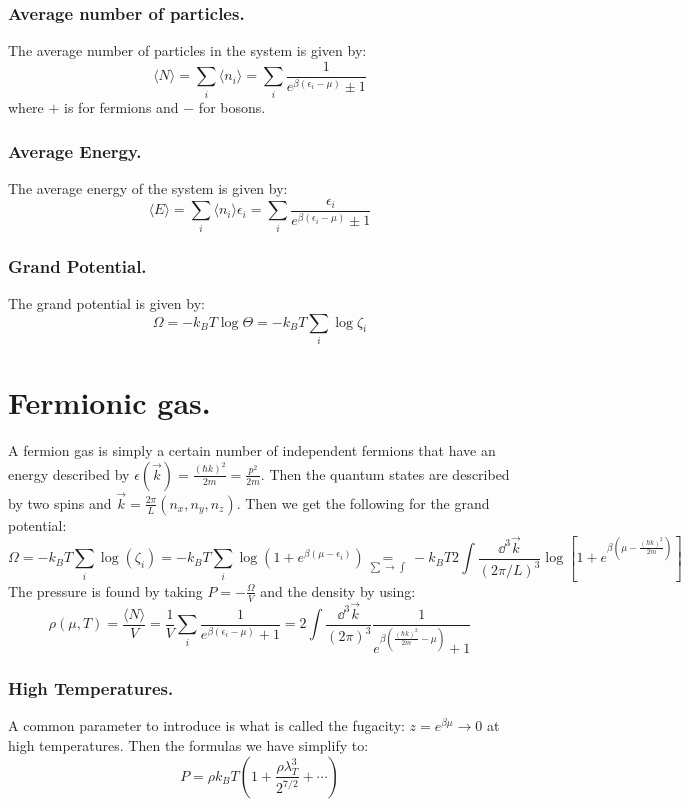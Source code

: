 \documentclass[10pt,a4paper]{book}
\begin{document}
\subsubsection{Average number of particles.}
The average number of particles in the system is given by:
\[
\langle N \rangle = \sum_i \langle n_i \rangle = \sum_i \frac{1}{e^{\beta(\epsilon_i - \mu)} \pm 1}
\]
where $+$ is for fermions and $-$ for bosons.
\subsubsection{Average Energy.}
The average energy of the system is given by:
\[
\langle E \rangle = \sum_i \langle n_i \rangle \epsilon_i = \sum_i \frac{\epsilon_i}{e^{\beta(\epsilon_i - \mu)} \pm 1}
\]

\subsubsection{Grand Potential.}
The grand potential is given by:
\[
\Omega = - k_B T \log \Theta = -k_B T \sum_i \log \zeta_i
\]

\section{Fermionic gas.}
A fermion gas is simply a certain number of independent fermions that have an energy described by $\epsilon(\vec{k}) = \frac{(\hbar k)^2}{2m} = \frac{p^2}{2m}$. Then the quantum states are described by two spins and $\vec{k} = \frac{2\pi}{L}(n_x, n_y, n_z)$. Then we get the following for the grand potential:
\[
\Omega = -k_BT\sum_i\log(\zeta_i)=-k_BT\sum_i\log(1+e^{\beta(\mu-\epsilon_i)})\underset{\sum\to\int}{=} -k_B T 2 \int \frac{\dd^3 \vec{k}}{(2 \pi/L)^3} \log[1 + e^{\beta(\mu - \frac{(\hbar k)^2}{2m})}]
\]
The pressure is found by taking $P = -\frac{\Omega}{V}$ and the density by using:
\[
\rho(\mu, T) = \frac{\langle N \rangle}{V} = \frac{1}{V}\sum_i \frac{1}{e^{\beta(\epsilon_i-\mu)}+1}=
2 \int \frac{\dd^3 \vec{k}}{(2\pi)^3} \frac{1}{e^{\beta(\frac{(\hbar k)^2}{2m} - \mu)} + 1}
\]

\subsubsection{High Temperatures.}
A common parameter to introduce is what is called the fugacity: $z = e^{\beta \mu} \to 0$ at high temperatures. Then the formulas we have simplify to:
\[
P = \rho k_B T\left(1 + \frac{\rho \lambda_T^3}{2^{7/2}}  + \cdots \right)
\]
\end{document}
